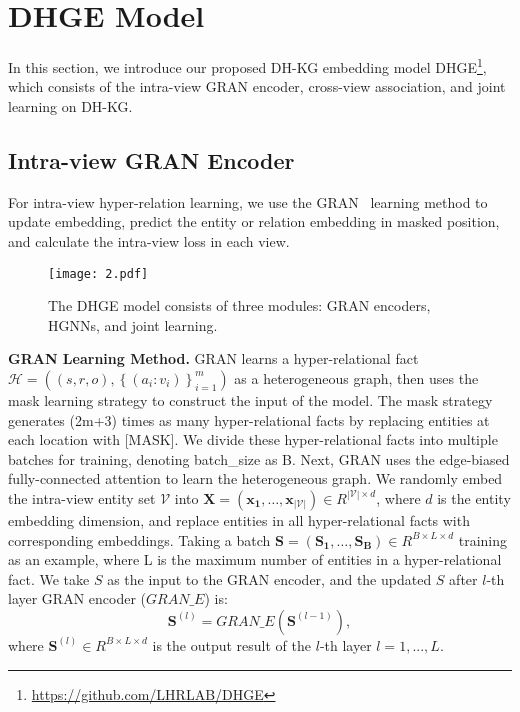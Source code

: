 \documentclass[letterpaper]{article} \usepackage{aaai23}  \usepackage{times}  \usepackage{helvet}  \usepackage{courier}  \usepackage[hyphens]{url}  \usepackage{graphicx} \urlstyle{rm} \def\UrlFont{\rm}  \usepackage{natbib}  \usepackage{caption} \frenchspacing  \setlength{\pdfpagewidth}{8.5in}  \setlength{\pdfpageheight}{11in}  \usepackage{times}
\begin{document}
\section{DHGE Model}
\label{s5}

In this section, we introduce our proposed DH-KG embedding model DHGE\footnote{\url{https://github.com/LHRLAB/DHGE}}, which consists of the intra-view GRAN encoder, cross-view association, and joint learning on DH-KG.

\subsection{Intra-view GRAN Encoder }

For intra-view hyper-relation learning, we use the GRAN~\citep{GRAN} learning method to update embedding, predict the entity or relation embedding in masked position, and calculate the intra-view loss in each view.

\begin{figure*}
    \centering
    \texttt{[image: 2.pdf]}
    \caption{The DHGE model consists of three modules: GRAN encoders, HGNNs, and joint learning.}
    \label{fig:my_label}
\end{figure*}

\textbf{GRAN Learning Method.} GRAN learns a hyper-relational fact $\mathcal{H}=\left((s, r, o),\left\{\left(a_{i}: v_{i}\right)\right\}_{i= 1}^{m}\right)$ as a heterogeneous graph, then uses the mask learning strategy to construct the input of the model. The mask strategy generates (2m+3) times as many hyper-relational facts by replacing entities at each location with [MASK]. We divide these hyper-relational facts into multiple batches for training, denoting batch\_size as B. Next, GRAN uses the edge-biased fully-connected attention to learn the heterogeneous graph. We randomly embed the intra-view entity set $\mathcal{V}$ into $\mathbf{X}=(\mathbf{x_1},\ldots,\mathbf{x_{|\mathcal{V}|}})\in R^{|\mathcal{V}|\times d}$, where $d$ is the entity embedding dimension, and replace entities in all hyper-relational facts with corresponding embeddings. Taking a batch $\mathbf{S} = ({\mathbf{S_1},\ldots,\mathbf{S_B}})\in R^{B\times L\times d}$ training as an example, where L is the maximum number of entities in a 
hyper-relational fact. We take $S$ as the input to the GRAN encoder, and the updated $S$ after $l$-th layer GRAN encoder ($GRAN\_E$) is: 
\begin{equation}
\mathbf{S}^{(l)}=GRAN\_E(\mathbf{S}^{(l-1)}),
\end{equation}
where $\mathbf{S}^{(l)}\in R^{B\times L\times d}$ is the output result of the $l$-th layer $l=1,...,L$.
\end{document}
